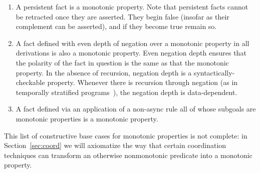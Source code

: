 
\begin{enumerate}
\item A persistent fact is a monotonic property.   
Note that persistent facts cannot be retracted once they are asserted.  They begin false
(insofar as their complement can be asserted), and if they become true remain so.

\item A fact defined with even depth of negation over a monotonic property in all derivations is also a monotonic property.  
Even negation depth ensures that the polarity of the fact in question is the
same as that the monotonic property.  In the absence of recursion, negation depth is a syntactically-checkable property.  Whenever there is recursion through negation
(as in temporally stratified \lang programs~\cite{dedalus}), the negation depth is data-dependent.

\item A fact defined via an application of a non-async rule all of whose subgoals are monotonic properties is a
monotonic property.


\end{enumerate}



This list of constructive base cases for monotonic properties is not complete:  
in Section~\ref{sec:coord} we will
axiomatize the way that certain coordination techniques can transform an otherwise 
nonmonotonic predicate into a monotonic property.




